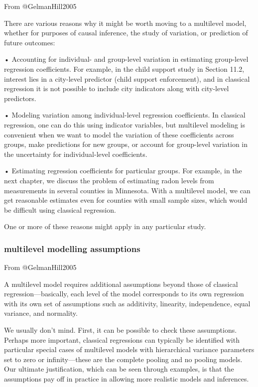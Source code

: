 \documentclass[
]{article}
\begin{document}
From @GelmanHill2005

There are various reasons why it might be worth moving to a multilevel
model, whether for purposes of causal inference, the study of variation,
or prediction of future outcomes:

• Accounting for individual- and group-level variation in estimating
group-level regression coefficients. For example, in the child support
study in Section 11.2, interest lies in a city-level predictor (child
support enforcement), and in classical regression it is not possible to
include city indicators along with city-level predictors.

• Modeling variation among individual-level regression coefficients. In
classical regression, one can do this using indicator variables, but
multilevel modeling is convenient when we want to model the variation of
these coefficients across groups, make predictions for new groups, or
account for group-level variation in the uncertainty for
individual-level coefficients.

• Estimating regression coefficients for particular groups. For example,
in the next chapter, we discuss the problem of estimating radon levels
from measurements in several counties in Minnesota. With a multilevel
model, we can get reasonable estimates even for counties with small
sample sizes, which would be difficult using classical regression.

One or more of these reasons might apply in any particular study.

\hypertarget{multilevel-modelling-assumptions}{%
\subsubsection{multilevel modelling
assumptions}\label{multilevel-modelling-assumptions}}

From @GelmanHill2005

A multilevel model requires additional assumptions beyond those of
classical regression---basically, each level of the model corresponds to
its own regression with its own set of assumptions such as additivity,
linearity, independence, equal variance, and normality.

We usually don't mind. First, it can be possible to check these
assumptions. Perhaps more important, classical regressions can typically
be identified with particular special cases of multilevel models with
hierarchical variance parameters set to zero or infinity---these are the
complete pooling and no pooling models. Our ultimate justification,
which can be seen through examples, is that the assumptions pay off in
practice in allowing more realistic models and inferences.
\end{document}
